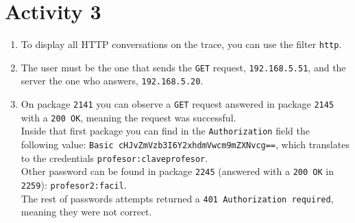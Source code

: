 \section*{Activity 3}
\begin{enumerate}
    \item To display all HTTP conversations on the trace, you can use the filter \texttt{http}.
    \item The user must be the one that sends the \texttt{GET} request, \texttt{192.168.5.51}, and the server the one who answers, \texttt{192.168.5.20}.
    \item On package \texttt{2141} you can observe a \texttt{GET} request answered in package \texttt{2145} with a \texttt{200 OK}, meaning the request was successful.\\
    Inside that first package you can find in the \texttt{Authorization} field the following value: \texttt{Basic cHJvZmVzb3I6Y2xhdmVwcm9mZXNvcg==}, which translates to the credentials \texttt{profesor:claveprofesor}.\\
    Other password can be found in package \texttt{2245} (answered with a \texttt{200 OK} in \texttt{2259}): \texttt{profesor2:facil}.\\
    The rest of passwords attempts returned a \texttt{401 Authorization required}, meaning they were not correct.
\end{enumerate}